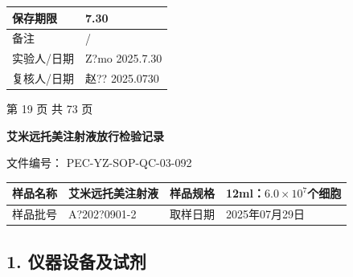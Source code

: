 \documentclass[UTF8,10pt,a4paper,fontset=fandol]{ctexart}
\newcommand{\fieldvalue}[1]{#1}
\newcommand{\handwritten}[1]{#1}
\begin{document}
\begin{center}
\begin{tabularx}{\textwidth}{|p{}|X|}
\hline
保存期限 &
\fieldvalue{\handwritten{7.30}}\\
\hline
备注 &
\fieldvalue{\handwritten{/}}\\
\hline
实验人/日期 &
\fieldvalue{\handwritten{Z?mo}}\quad
\fieldvalue{\handwritten{2025.7.30}}\\
\hline
复核人/日期 &
\fieldvalue{\handwritten{赵??}}\quad
\fieldvalue{\handwritten{2025.0730}}\\
\hline
\end{tabularx}

\vfill
\centering
第 19 页 共 73 页

\newpage

\begin{center}
\textbf{艾米远托美注射液放行检验记录}
\end{center}

\noindent 文件编号：
\fieldvalue{PEC-YZ-SOP-QC-03-092}

\begin{tabularx}{\textwidth}{|l|X|l|X|}
\hline
样品名称 &
\fieldvalue{艾米远托美注射液} &
样品规格 &
\fieldvalue{12ml：$6.0\times10^{7}$个细胞}
\\ \hline
样品批号 &
\fieldvalue{\handwritten{A?202?0901-2}} &
取样日期 &
\fieldvalue{\handwritten{2025年07月29日}}
\\ \hline
\end{tabularx}

\subsection*{1. 仪器设备及试剂}


\end{center}
\end{document}
